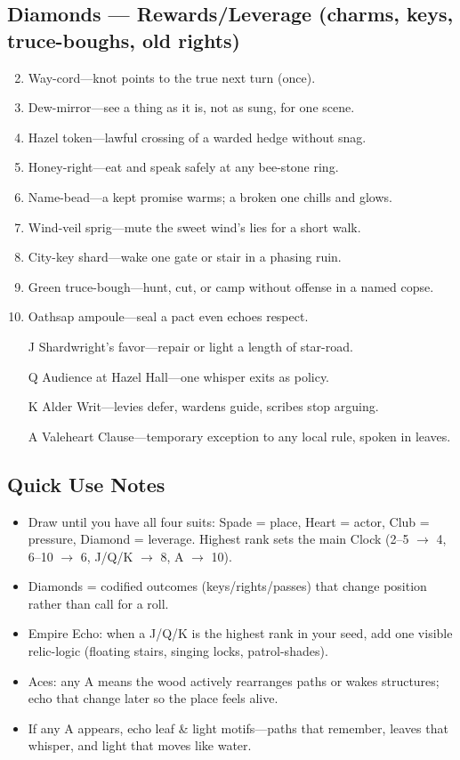 \subsection*{Diamonds --- Rewards/Leverage (charms, keys, truce-boughs, old rights)}
\label{sec:valewood-rewards}
\begin{enumerate}
\setcounter{enumi}{1}
\item Way-cord---knot points to the true next turn (once).
\item Dew-mirror---see a thing as it is, not as sung, for one scene.
\item Hazel token---lawful crossing of a warded hedge without snag.
\item Honey-right---eat and speak safely at any bee-stone ring.
\item Name-bead---a kept promise warms; a broken one chills and glows.
\item Wind-veil sprig---mute the sweet wind's lies for a short walk.
\item City-key shard---wake one gate or stair in a phasing ruin.
\item Green truce-bough---hunt, cut, or camp without offense in a named copse.
\item Oathsap ampoule---seal a pact even echoes respect.
\item[J] Shardwright's favor---repair or light a length of star-road.
\item[Q] Audience at Hazel Hall---one whisper exits as policy.
\item[K] Alder Writ---levies defer, wardens guide, scribes stop arguing.
\item[A] Valeheart Clause---temporary exception to any local rule, spoken in leaves.
\end{enumerate}

\subsection*{Quick Use Notes}
\label{sec:valewood-quick-use}
\begin{itemize}
\item Draw until you have all four suits: Spade = place, Heart = actor, Club = pressure, Diamond = leverage. Highest rank sets the main Clock (2--5 $\rightarrow$ 4, 6--10 $\rightarrow$ 6, J/Q/K $\rightarrow$ 8, A $\rightarrow$ 10).
\item Diamonds = codified outcomes (keys/rights/passes) that change position rather than call for a roll.
\item Empire Echo: when a J/Q/K is the highest rank in your seed, add one visible relic-logic (floating stairs, singing locks, patrol-shades).
\item Aces: any A means the wood actively rearranges paths or wakes structures; echo that change later so the place feels alive.
\item If any A appears, echo leaf \& light motifs---paths that remember, leaves that whisper, and light that moves like water.
\end{itemize}

